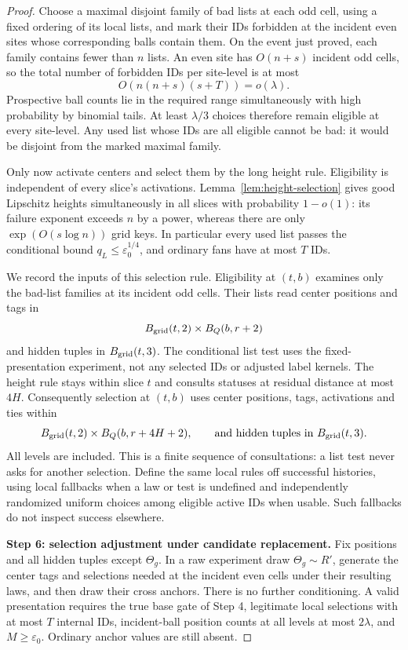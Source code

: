 \begin{proof}
Choose a maximal disjoint family of bad lists at each odd cell, using a fixed ordering of its local lists, and mark their IDs forbidden at the incident even sites whose corresponding balls contain them. On the event just proved, each family contains fewer than \(n\) lists. An even site has \(O(n+s)\) incident odd cells, so the total number of forbidden IDs per site-level is at most
\[
 O(n(n+s)(s+T))=o(\lambda).
\]
Prospective ball counts lie in the required range simultaneously with high probability by binomial tails. At least \(\lambda/3\) choices therefore remain eligible at every site-level. Any used list whose IDs are all eligible cannot be bad: it would be disjoint from the marked maximal family.

Only now activate centers and select them by the long height rule. Eligibility is independent of every slice's activations. Lemma~\ref{lem:height-selection} gives good Lipschitz heights simultaneously in all slices with probability \(1-o(1)\): its failure exponent exceeds \(n\) by a power, whereas there are only \(\exp(O(s\log n))\) grid keys. In particular every used list passes the conditional bound \(q_L\le\varepsilon_0^{1/4}\), and ordinary fans have at most \(T\) IDs.

We record the inputs of this selection rule. Eligibility at \((t,b)\) examines only the bad-list families at its incident odd cells. Their lists read center positions and tags in
\[
 B_{\rm grid}(t,2)\times B_Q(b,r+2)
\]
and hidden tuples in \(B_{\rm grid}(t,3)\). The conditional list test uses the fixed-presentation experiment, not any selected IDs or adjusted label kernels. The height rule stays within slice \(t\) and consults statuses at residual distance at most \(4H\). Consequently selection at \((t,b)\) uses center positions, tags, activations and ties within
\[
 B_{\rm grid}(t,2)\times B_Q(b,r+4H+2),
 \qquad\text{and hidden tuples in }B_{\rm grid}(t,3).
\]
All levels are included. This is a finite sequence of consultations: a list test never asks for another selection. Define the same local rules off successful histories, using local fallbacks when a law or test is undefined and independently randomized uniform choices among eligible active IDs when usable. Such fallbacks do not inspect success elsewhere.

\noindent\textbf{Step 6: selection adjustment under candidate replacement.}\quad
Fix positions and all hidden tuples except \(\Theta_g\). In a raw experiment draw \(\Theta_g\sim R'\), generate the center tags and selections needed at the incident even cells under their resulting laws, and then draw their cross anchors. There is no further conditioning. A valid presentation requires the true base gate of Step 4, legitimate local selections with at most \(T\) internal IDs, incident-ball position counts at all levels at most \(2\lambda\), and \(M\ge\varepsilon_0\). Ordinary anchor values are still absent.


\end{proof}
